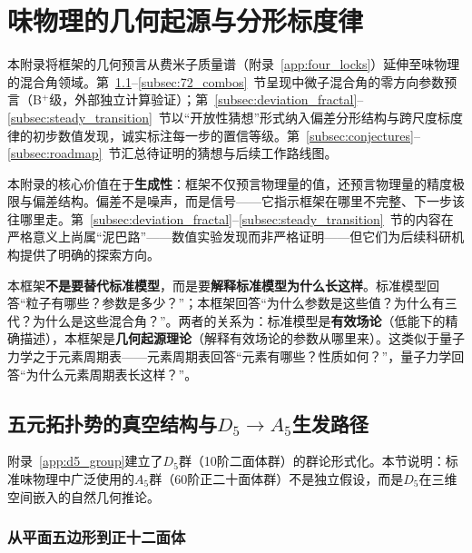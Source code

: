 
\section{味物理的几何起源与分形标度律}
\label{app:flavor_geometry}

本附录将框架的几何预言从费米子质量谱（附录~\ref{app:four_locks}）延伸至味物理的混合角领域。第~\ref{subsec:d5_a5_path}--\ref{subsec:72_combos}~节呈现中微子混合角的零方向参数预言（B$^+$级，外部独立计算验证）；第~\ref{subsec:deviation_fractal}--\ref{subsec:steady_transition}~节以``开放性猜想''形式纳入偏差分形结构与跨尺度标度律的初步数值发现，诚实标注每一步的置信等级。第~\ref{subsec:conjectures}--\ref{subsec:roadmap}~节汇总待证明的猜想与后续工作路线图。

\begin{remark}[本附录的定位]
本附录的核心价值在于\textbf{生成性}：框架不仅预言物理量的值，还预言物理量的精度极限与偏差结构。偏差不是噪声，而是信号——它指示框架在哪里不完整、下一步该往哪里走。第~\ref{subsec:deviation_fractal}--\ref{subsec:steady_transition}~节的内容在严格意义上尚属``泥巴路''——数值实验发现而非严格证明——但它们为后续科研机构提供了明确的探索方向。
\end{remark}

\begin{remark}[与标准模型的关系定位]
\label{rmk:sm_relation}
本框架\textbf{不是要替代标准模型}，而是要\textbf{解释标准模型为什么长这样}。标准模型回答``粒子有哪些？参数是多少？''；本框架回答``为什么参数是这些值？为什么有三代？为什么是这些混合角？''。两者的关系为：标准模型是\textbf{有效场论}（低能下的精确描述），本框架是\textbf{几何起源理论}（解释有效场论的参数从哪里来）。这类似于量子力学之于元素周期表——元素周期表回答``元素有哪些？性质如何？''，量子力学回答``为什么元素周期表长这样？''。
\end{remark}

\subsection{五元拓扑势的真空结构与$D_5 \to A_5$生发路径}
\label{subsec:d5_a5_path}

附录~\ref{app:d5_group}建立了$D_5$群（10阶二面体群）的群论形式化。本节说明：标准味物理中广泛使用的$A_5$群（60阶正二十面体群）不是独立假设，而是$D_5$在三维空间嵌入的自然几何推论。

\subsubsection{从平面五边形到正十二面体}

